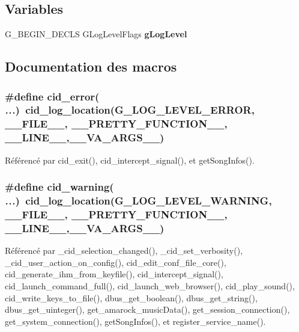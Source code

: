 \subsection*{Variables}
\begin{CompactItemize}
\item 
G\_\-BEGIN\_\-DECLS GLogLevelFlags {\bf gLogLevel}
\end{CompactItemize}


\subsection{Documentation des macros}
\subsubsection{\setlength{\rightskip}{0pt plus 5cm}\#define cid\_\-error( {\em ...})~cid\_\-log\_\-location(G\_\-LOG\_\-LEVEL\_\-ERROR, \_\-\_\-FILE\_\-\_\-, \_\-\_\-PRETTY\_\-FUNCTION\_\-\_\-, \_\-\_\-LINE\_\-\_\-,\_\-\_\-VA\_\-ARGS\_\-\_\-)}\label{cid-messages_8h_3b72900660a730f1f06d58228f37e733}




Référencé par cid\_\-exit(), cid\_\-intercept\_\-signal(), et getSongInfos().
\subsubsection{\setlength{\rightskip}{0pt plus 5cm}\#define cid\_\-warning( {\em ...})~cid\_\-log\_\-location(G\_\-LOG\_\-LEVEL\_\-WARNING, \_\-\_\-FILE\_\-\_\-, \_\-\_\-PRETTY\_\-FUNCTION\_\-\_\-, \_\-\_\-LINE\_\-\_\-,\_\-\_\-VA\_\-ARGS\_\-\_\-)}\label{cid-messages_8h_dc4ecfea8c975b6715d7b6fda0c72d4a}




Référencé par \_\-cid\_\-selection\_\-changed(), \_\-cid\_\-set\_\-verbosity(), \_\-cid\_\-user\_\-action\_\-on\_\-config(), cid\_\-edit\_\-conf\_\-file\_\-core(), cid\_\-generate\_\-ihm\_\-from\_\-keyfile(), cid\_\-intercept\_\-signal(), cid\_\-launch\_\-command\_\-full(), cid\_\-launch\_\-web\_\-browser(), cid\_\-play\_\-sound(), cid\_\-write\_\-keys\_\-to\_\-file(), dbus\_\-get\_\-boolean(), dbus\_\-get\_\-string(), dbus\_\-get\_\-uinteger(), get\_\-amarock\_\-musicData(), get\_\-session\_\-connection(), get\_\-system\_\-connection(), getSongInfos(), et register\_\-service\_\-name().
